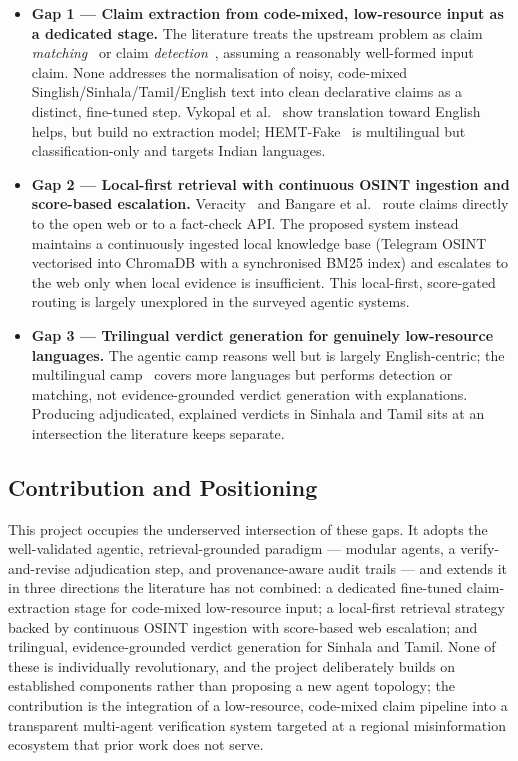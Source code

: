 \documentclass[12pt,a4paper]{article}
\begin{document}
\begin{itemize}
    \item \textbf{Gap 1 --- Claim extraction from code-mixed, low-resource input as
    a dedicated stage.} The literature treats the upstream problem as claim
    \textit{matching}~\cite{factgpt} or claim \textit{detection}~\cite{vykopal},
    assuming a reasonably well-formed input claim. None addresses the normalisation
    of noisy, code-mixed Singlish/Sinhala/Tamil/English text into clean declarative
    claims as a distinct, fine-tuned step. Vykopal et al.~\cite{vykopal} show
    translation toward English helps, but build no extraction model;
    HEMT-Fake~\cite{hemtfake} is multilingual but classification-only and targets
    Indian languages.
    \item \textbf{Gap 2 --- Local-first retrieval with continuous OSINT ingestion
    and score-based escalation.} Veracity~\cite{veracity} and
    Bangare et al.~\cite{bangare} route claims directly to the open web or to a
    fact-check API. The proposed system instead maintains a continuously ingested
    local knowledge base (Telegram OSINT vectorised into ChromaDB with a
    synchronised BM25 index) and escalates to the web only when local evidence is
    insufficient. This local-first, score-gated routing is largely unexplored in
    the surveyed agentic systems.
    \item \textbf{Gap 3 --- Trilingual verdict generation for genuinely
    low-resource languages.} The agentic camp reasons well but is largely
    English-centric; the multilingual camp~\cite{vykopal,hemtfake} covers more
    languages but performs detection or matching, not evidence-grounded verdict
    generation with explanations. Producing adjudicated, explained verdicts in
    Sinhala and Tamil sits at an intersection the literature keeps separate.
\end{itemize}

\subsection{Contribution and Positioning}
This project occupies the underserved intersection of these gaps. It adopts the
well-validated agentic, retrieval-grounded paradigm --- modular agents, a
verify-and-revise adjudication step, and provenance-aware audit trails --- and
extends it in three directions the literature has not combined: a dedicated
fine-tuned claim-extraction stage for code-mixed low-resource input; a local-first
retrieval strategy backed by continuous OSINT ingestion with score-based web
escalation; and trilingual, evidence-grounded verdict generation for Sinhala and
Tamil. None of these is individually revolutionary, and the project deliberately
builds on established components rather than proposing a new agent topology; the
contribution is the integration of a low-resource, code-mixed claim pipeline into
a transparent multi-agent verification system targeted at a regional
misinformation ecosystem that prior work does not serve.
\end{document}
